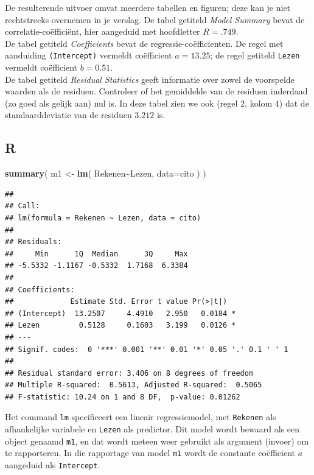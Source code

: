 \documentclass[
]{book}
\newenvironment{Shaded}{\begin{snugshade}}{\end{snugshade}}
\newcommand{\AttributeTok}[1]{\textcolor[rgb]{0.13,0.29,0.53}{#1}}
\newcommand{\FunctionTok}[1]{\textcolor[rgb]{0.13,0.29,0.53}{\textbf{#1}}}
\newcommand{\NormalTok}[1]{#1}
\newcommand{\OtherTok}[1]{\textcolor[rgb]{0.56,0.35,0.01}{#1}}
\newcommand{\SpecialCharTok}[1]{\textcolor[rgb]{0.81,0.36,0.00}{\textbf{#1}}}
\begin{document}
De resulterende uitvoer omvat meerdere tabellen en figuren; deze kan je
niet rechtstreeks overnemen in je verslag. De tabel getiteld \emph{Model
Summary} bevat de correlatie-coëfficiënt, hier aangeduid met hoofdletter
\(R=.749\).\\
De tabel getiteld \emph{Coefficients} bevat de regressie-coëfficienten. De
regel met aanduiding \texttt{(Intercept)} vermeldt coëfficient \(a=13.25\); de
regel getiteld \texttt{Lezen} vermeldt coëfficient \(b=0.51\).\\
De tabel getiteld \emph{Residual Statistics} geeft informatie over zowel de
voorspelde waarden als de residuen. Controleer of het gemiddelde van de
residuen inderdaad (zo goed als gelijk aan) nul is. In deze tabel zien we ook (regel 2, kolom 4)
dat de standaarddeviatie van de residuen \(3.212\) is.

\subsection{R}\label{r-8}

\begin{Shaded}
\begin{Highlighting}[]
\FunctionTok{summary}\NormalTok{( m1 }\OtherTok{\textless{}{-}} \FunctionTok{lm}\NormalTok{( Rekenen}\SpecialCharTok{\textasciitilde{}}\NormalTok{Lezen, }\AttributeTok{data=}\NormalTok{cito ) )}
\end{Highlighting}
\end{Shaded}

\begin{verbatim}
## 
## Call:
## lm(formula = Rekenen ~ Lezen, data = cito)
## 
## Residuals:
##     Min      1Q  Median      3Q     Max 
## -5.5332 -1.1167 -0.5332  1.7168  6.3384 
## 
## Coefficients:
##             Estimate Std. Error t value Pr(>|t|)  
## (Intercept)  13.2507     4.4910   2.950   0.0184 *
## Lezen         0.5128     0.1603   3.199   0.0126 *
## ---
## Signif. codes:  0 '***' 0.001 '**' 0.01 '*' 0.05 '.' 0.1 ' ' 1
## 
## Residual standard error: 3.406 on 8 degrees of freedom
## Multiple R-squared:  0.5613, Adjusted R-squared:  0.5065 
## F-statistic: 10.24 on 1 and 8 DF,  p-value: 0.01262
\end{verbatim}

Het command \texttt{lm} specificeert een lineair regressiemodel, met \texttt{Rekenen}
als afhankelijke variabele en \texttt{Lezen} als predictor. Dit model wordt
bewaard als een object genaamd \texttt{m1}, en dat wordt meteen weer gebruikt
als argument (invoer) om te rapporteren. In die rapportage van model
\texttt{m1} wordt de constante coëfficient \(a\) aangeduid als \texttt{Intercept}.
\end{document}
